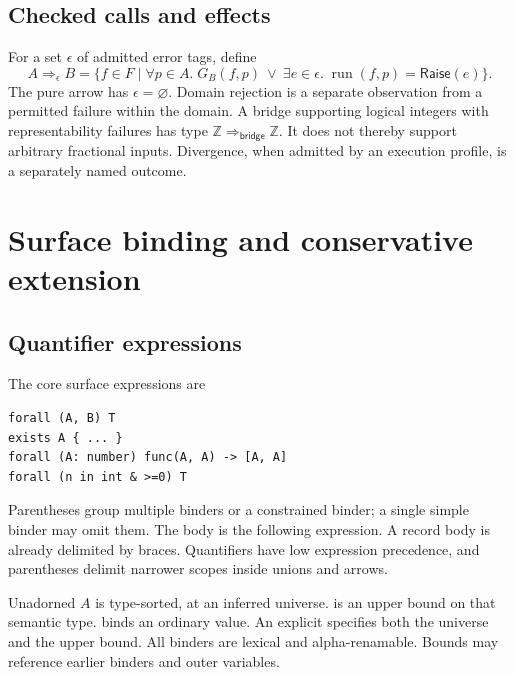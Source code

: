 \documentclass[11pt,a4paper,oneside]{report}
\newcommand{\code}[1]{\texttt{\detokenize{#1}}}
\newcommand{\Run}{\operatorname{run}}
\newcommand{\Raise}{\mathsf{Raise}}
\newcommand{\Int}{\mathbb Z}
\theoremstyle{remark}
\begin{document}
\section{Checked calls and effects}
For a set $\epsilon$ of admitted error tags, define
\[
 A\Rightarrow_\epsilon B
 =\{f\in F\mid\forall p\in A.\;
       G_B(f,p)\ \lor\ \exists e\in\epsilon.\;\Run(f,p)=\Raise(e)\}.
\]
The pure arrow has $\epsilon=\varnothing$. Domain rejection is a separate
observation from a permitted failure within the domain. A bridge supporting
logical integers with representability failures has type
$\Int\Rightarrow_{\mathsf{bridge}}\Int$. It does not thereby support arbitrary
fractional inputs. Divergence, when admitted by an execution profile, is a
separately named outcome.


\chapter{Surface binding and conservative extension}
\label{ch:surface}
\section{Quantifier expressions}
The core surface expressions are
\par\noindent\begin{minipage}{\linewidth}
\begin{lstlisting}
forall (A, B) T
exists A { ... }
forall (A: number) func(A, A) -> [A, A]
forall (n in int & >=0) T
\end{lstlisting}
\end{minipage}\par
Parentheses group multiple binders or a constrained binder; a single simple
binder may omit them. The body is the following expression. A record body is
already delimited by braces. Quantifiers have low expression precedence, and
parentheses delimit narrower scopes inside unions and arrows.

Unadorned $A$ is type-sorted, at an inferred universe. \code{A: T} is an upper
bound on that semantic type. \code{x in T} binds an ordinary value. An explicit
\code{A in Type(n): T} specifies both the universe and the upper bound.
All binders are lexical and alpha-renamable. Bounds may reference earlier
binders and outer variables.
\end{document}
